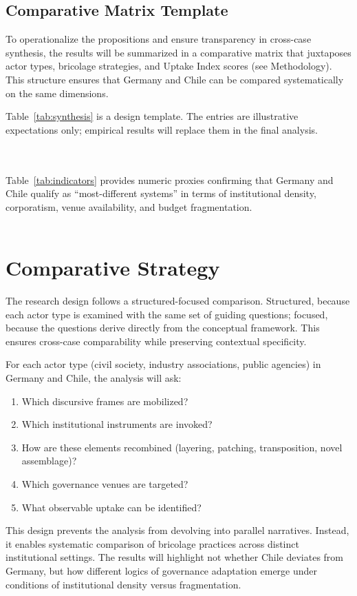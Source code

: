 \subsection*{Comparative Matrix Template}

To operationalize the propositions and ensure transparency in cross-case synthesis, 
the results will be summarized in a comparative matrix that juxtaposes actor types, 
bricolage strategies, and Uptake Index scores (see Methodology). 
This structure ensures that Germany and Chile can be compared systematically 
on the same dimensions.

Table~\ref{tab:synthesis} is a design template. The entries are illustrative 
expectations only; empirical results will replace them in the final analysis.


\\
\\


Table~\ref{tab:indicators} provides numeric proxies confirming that Germany and
Chile qualify as “most-different systems” in terms of institutional density,
corporatism, venue availability, and budget fragmentation.
\\
\\
\section*{Comparative Strategy}

The research design follows a structured-focused comparison. 
Structured, because each actor type is examined with the same set of guiding questions; 
focused, because the questions derive directly from the conceptual framework. 
This ensures cross-case comparability while preserving contextual specificity.

For each actor type (civil society, industry associations, public agencies) in Germany and Chile, 
the analysis will ask:

\begin{enumerate}
    \item Which discursive frames are mobilized? 
    \item Which institutional instruments are invoked? 
    \item How are these elements recombined (layering, patching, transposition, novel assemblage)? 
    \item Which governance venues are targeted? 
    \item What observable uptake can be identified? 
\end{enumerate}

This design prevents the analysis from devolving into parallel narratives. 
Instead, it enables systematic comparison of bricolage practices across distinct institutional settings. 
The results will highlight not whether Chile deviates from Germany, 
but how different logics of governance adaptation emerge under conditions of institutional density versus fragmentation.

